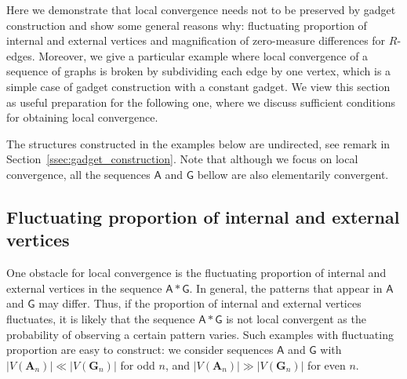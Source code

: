 \documentclass[11pt]{article}
\theoremstyle{plain}
\theoremstyle{definition}
\theoremstyle{remark}
\newcommand{\str}[1]{\mathbf{#1}}
\newcommand{\strseq}[1]{{\boldsymbol{\mathsf{#1}}}}
\begin{document}
Here we demonstrate that local convergence needs not to be preserved by gadget construction and show some general reasons why: fluctuating proportion of internal and external vertices and magnification of zero-measure differences for $R$-edges.
Moreover, we give a particular example where local convergence of a sequence of graphs is broken by subdividing each edge by one vertex, which is a simple case of gadget construction with a constant gadget.
We view this section as useful preparation for the following one, where we discuss sufficient conditions for obtaining local convergence.

The structures constructed in the examples below are undirected, see remark in Section~\ref{ssec:gadget_construction}.
Note that although we focus on local convergence, all the sequences $\strseq{A}$ and $\strseq{G}$ bellow are also elementarily convergent.

\subsection{Fluctuating proportion of internal and external vertices}\label{ssec:fluctuating_proportion_of_internal_and_external_vertices}

One obstacle for local convergence is the fluctuating proportion of internal and external vertices in the sequence $\strseq{A}*\strseq{G}$.
In general, the patterns that appear in $\strseq{A}$ and $\strseq{G}$ may differ.
Thus, if the proportion of internal and external vertices fluctuates, it is likely that the sequence $\strseq{A}*\strseq{G}$ is not local convergent as the probability of observing a certain pattern varies.
Such examples with fluctuating proportion are easy to construct: we consider sequences $\strseq{A}$ and $\strseq{G}$ with $|V(\str{A}_n)| \ll |V(\str{G}_n)|$ for odd $n$, and $|V(\str{A}_n)| \gg |V(\str{G}_n)|$ for even $n$.
\end{document}
